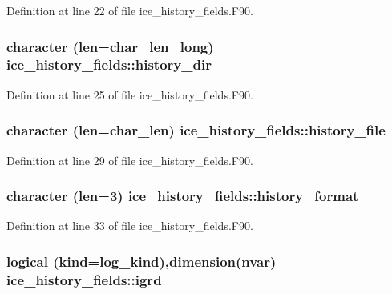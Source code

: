 Definition at line 22 of file ice\_\-history\_\-fields.F90.\hypertarget{namespaceice__history__fields_ad01cae93d8dc2047429cb0e05167039d}{
\subsubsection[{history\_\-dir}]{\setlength{\rightskip}{0pt plus 5cm}character (len=char\_\-len\_\-long) {\bf ice\_\-history\_\-fields::history\_\-dir}}}
\label{namespaceice__history__fields_ad01cae93d8dc2047429cb0e05167039d}


Definition at line 25 of file ice\_\-history\_\-fields.F90.\hypertarget{namespaceice__history__fields_a9c351e060cb10822d8e53ef2ebfaa0fa}{
\subsubsection[{history\_\-file}]{\setlength{\rightskip}{0pt plus 5cm}character (len=char\_\-len) {\bf ice\_\-history\_\-fields::history\_\-file}}}
\label{namespaceice__history__fields_a9c351e060cb10822d8e53ef2ebfaa0fa}


Definition at line 29 of file ice\_\-history\_\-fields.F90.\hypertarget{namespaceice__history__fields_a1f38b0cd52722e7ed80947313d84936a}{
\subsubsection[{history\_\-format}]{\setlength{\rightskip}{0pt plus 5cm}character (len=3) {\bf ice\_\-history\_\-fields::history\_\-format}}}
\label{namespaceice__history__fields_a1f38b0cd52722e7ed80947313d84936a}


Definition at line 33 of file ice\_\-history\_\-fields.F90.\hypertarget{namespaceice__history__fields_a7efcc39b544df18b2e0d1952257eb758}{
\subsubsection[{igrd}]{\setlength{\rightskip}{0pt plus 5cm}logical (kind=log\_\-kind),dimension({\bf nvar}) {\bf ice\_\-history\_\-fields::igrd}}}
\label{namespaceice__history__fields_a7efcc39b544df18b2e0d1952257eb758}


